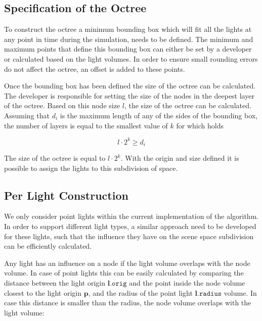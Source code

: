 \subsection{Specification of the Octree}

To construct the octree a minimum bounding box which will fit all the lights at any
point in time during the simulation, needs to be defined. The minimum and maximum
points that define this bounding box can either be set by a developer or calculated
based on the light volumes. In order to ensure small rounding errors do not affect
the octree, an offset is added to these points.

Once the bounding box has been defined the size of the octree can be calculated. The
developer is responsible for setting the size of the nodes in the deepest layer of
the octree. Based on this node size $\mathit{l}$, the size of the octree can be calculated.
Assuming that $\mathit{d}_i$ is the maximum length of any of the sides of the
bounding box, the number of layers is equal to the smallest value of $k$ for
which holds

\begin{equation*}
  \mathit{l} \cdot 2^k \geq \mathit{d}_i
\end{equation*}

\noindent The size of the octree is equal to $\mathit{l} \cdot 2^k$.
With the origin and size defined it is possible to assign the lights to this subdivision of
space.

\subsection{Per Light Construction}



We only consider point lights within the current implementation of the algorithm. In order to
support different light types, a similar approach need to be developed for these lights, such
that the influence they have on the scene space subdivision can be efficiently calculated.

Any light has an influence on a node if the light volume overlaps with the node volume. In case
of point lights this can be easily calculated by comparing the distance between the light origin
$\mathbf{l}\mathtt{.orig}$ and the point inside the node volume closest to the light origin $\mathbf{p}$,
and the radius of the point light $\mathbf{l}\mathtt{.radius}$
volume. In case this distance is smaller than the radius, the node volume overlaps with the light
volume:

